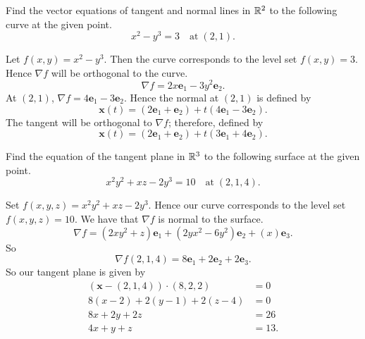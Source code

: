 \question Find the vector equations of tangent and normal lines in $\mathbb{R}^2$ to the following curve at the given point.
\[ x^2 - y^3 = 3 \quad\text{at}\; (2, 1). \]
\begin{solution}
    Let $f(x, y) = x^2 - y^3$. Then the curve corresponds to the level set $f(x, y) = 3$. Hence $\nabla f$ will be orthogonal to the curve.
    \[ \nabla f = 2x \bm e_1 - 3y^2 \bm e_2. \]
    At $(2, 1)$, $\nabla f = 4 \bm e_1 - 3\bm e_2$. Hence the normal at $(2, 1)$ is defined by
    \[ \bm x(t) = (2\bm e_1 + \bm e_2) + t(4 \bm e_1 - 3 \bm e_2). \]
    The tangent will be orthogonal to $\nabla f$; therefore, defined by
    \[ \bm x(t) = (2\bm e_1 + \bm e_2) + t(3 \bm e_1 + 4\bm e_2). \]
\end{solution}

\question Find the equation of the tangent plane in $\mathbb{R}^3$ to the following surface at the given point.
\[ x^2y^2 + xz - 2y^3 = 10 \quad\text{at}\; (2, 1, 4). \]
\begin{solution}
    Set $f(x, y ,z) = x^2y^2 + xz - 2y^3$. Hence our curve corresponds to the level set $f(x, y, z) = 10$. We have that $\nabla f$ is normal to the surface.
    \[ \nabla f = (2xy^2 + z)\bm e_1 + (2yx^2 - 6y^2)\bm e_2 + (x) \bm e_3. \]
    So
    \[ \nabla f(2, 1, 4) = 8 \bm e_1 + 2\bm e_2 + 2 \bm e_3. \]
    So our tangent plane is given by
    \begin{align*}
        (\bm x - (2, 1, 4))\cdot (8, 2, 2) &= 0  \\
        8(x - 2) + 2(y - 1) + 2(z - 4)     &= 0  \\
        8x + 2y + 2z                       &= 26 \\
        4x + y + z                         &= 13.
    \end{align*}
\end{solution}
